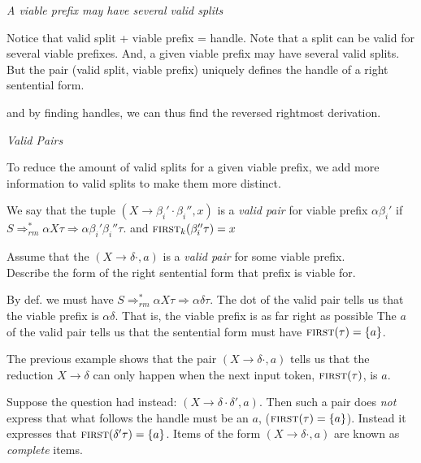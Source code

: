 \frmrule 

\textit{A viable prefix may have several valid splits}



\frmrule 

Notice that valid split + viable prefix = handle. 
Note that a split can be valid for several viable prefixes. And, 
a given viable prefix may have several valid splits. But the pair (valid split, 
viable prefix) uniquely defines the handle of a right sentential form.  

and by finding handles, we can thus find the reversed rightmost derivation.


\frmrule 

\textit{Valid Pairs}

To reduce the amount of valid splits for a given viable prefix, 
we add more information to valid splits to make them more distinct. 

We say that the tuple $(X \rightarrow \beta_{i}' \cdot \beta_{i}'', x)$ is a \textit{valid pair} for viable prefix $\alpha\beta_{i}'$ 
if $S \Rightarrow^{*}_{rm} \alpha X \tau \Rightarrow \alpha \beta_{i}' \beta_{i}'' \tau$.
and $\textsc{first}_k(\beta_{i}'' \tau) = x$ 


\frmrule 

\begin{example}
Assume that the $(X \rightarrow \delta \cdot , a)$ is a \textit{valid pair} for some viable prefix. \\
Describe the form of the right sentential form that prefix is viable for. 

By def. we must have $S \Rightarrow^{*}_{rm} \alpha X \tau \Rightarrow \alpha \delta \tau$. 
The dot of the valid pair tells us that the viable prefix is $\alpha \delta$. That is, the viable prefix 
is as far right as possible
The $a$ of the valid pair tells us that the sentential form must have $\textsc{first}(\tau) = \{a\}$. 
\end{example}

\frmrule 

The previous example shows that
the pair $(X \rightarrow \delta \cdot , a)$ tells us that 
the reduction $X \rightarrow \delta$ can only happen when 
the next input token, $\textsc{first}(\tau)$, is $a$. 

Suppose the question had instead: $(X \rightarrow \delta \cdot \delta', a)$.
Then such a pair does \textit{not} express that what follows the handle must be an $a$, ($\textsc{first}(\tau) = \{a\}$).
Instead it expresses that $\textsc{first}(\delta'\tau) = \{a\}$. 
Items of the form $(X \rightarrow \delta \cdot, a)$ are known as \textit{complete} items.

